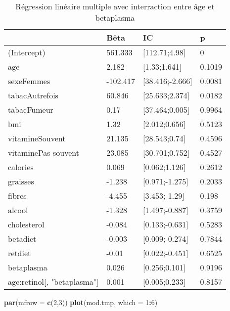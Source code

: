\documentclass[]{article}
\newenvironment{Shaded}{\begin{snugshade}}{\end{snugshade}}
\newcommand{\KeywordTok}[1]{\textcolor[rgb]{0.13,0.29,0.53}{\textbf{#1}}}
\newcommand{\DataTypeTok}[1]{\textcolor[rgb]{0.13,0.29,0.53}{#1}}
\newcommand{\DecValTok}[1]{\textcolor[rgb]{0.00,0.00,0.81}{#1}}
\newcommand{\OperatorTok}[1]{\textcolor[rgb]{0.81,0.36,0.00}{\textbf{#1}}}
\newcommand{\NormalTok}[1]{#1}
\begin{document}
\begin{table}

\caption{\label{tab:unnamed-chunk-59}Régression linéaire multiple avec interraction entre âge et betaplasma}
\centering
\begin{tabular}[t]{l|l|l|l}
\hline
  & Bêta & IC & p\\
\hline
\rowcolor[HTML]{BBD2E1}  (Intercept) & 561.333 & [112.71;4.98] & 0\\
\hline
age & 2.182 & [1.33;1.641] & 0.1019\\
\hline
\rowcolor[HTML]{BBD2E1}  sexeFemmes & -102.417 & [38.416;-2.666] & 0.0081\\
\hline
tabacAutrefois & 60.846 & [25.633;2.374] & 0.0182\\
\hline
\rowcolor[HTML]{BBD2E1}  tabacFumeur & 0.17 & [37.464;0.005] & 0.9964\\
\hline
bmi & 1.32 & [2.012;0.656] & 0.5123\\
\hline
\rowcolor[HTML]{BBD2E1}  vitamineSouvent & 21.135 & [28.543;0.74] & 0.4596\\
\hline
vitaminePas-souvent & 23.085 & [30.701;0.752] & 0.4527\\
\hline
\rowcolor[HTML]{BBD2E1}  calories & 0.069 & [0.062;1.126] & 0.2612\\
\hline
graisses & -1.238 & [0.971;-1.275] & 0.2033\\
\hline
\rowcolor[HTML]{BBD2E1}  fibres & -4.455 & [3.453;-1.29] & 0.198\\
\hline
alcool & -1.328 & [1.497;-0.887] & 0.3759\\
\hline
\rowcolor[HTML]{BBD2E1}  cholesterol & -0.084 & [0.133;-0.631] & 0.5283\\
\hline
betadiet & -0.003 & [0.009;-0.274] & 0.7844\\
\hline
\rowcolor[HTML]{BBD2E1}  retdiet & -0.01 & [0.022;-0.451] & 0.6525\\
\hline
betaplasma & 0.026 & [0.256;0.101] & 0.9196\\
\hline
\rowcolor[HTML]{BBD2E1}  age:retinol[, "betaplasma"] & 0.001 & [0.005;0.233] & 0.8157\\
\hline
\end{tabular}
\end{table}

\begin{Shaded}
\begin{Highlighting}[]
\KeywordTok{par}\NormalTok{(}\DataTypeTok{mfrow =} \KeywordTok{c}\NormalTok{(}\DecValTok{2}\NormalTok{,}\DecValTok{3}\NormalTok{))}
\KeywordTok{plot}\NormalTok{(mod.tmp, }\DataTypeTok{which =} \DecValTok{1}\OperatorTok{:}\DecValTok{6}\NormalTok{)}
\end{Highlighting}
\end{Shaded}
\end{document}
